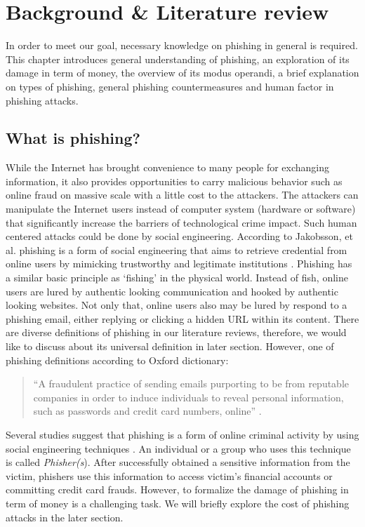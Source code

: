 
\chapter{Background \& Literature review}

In order to meet our goal, necessary knowledge on phishing in general
is required. This chapter introduces general understanding of phishing,
an exploration of its damage in term of money, the overview of its
modus operandi, a brief explanation on types of phishing, general
phishing countermeasures and human factor in phishing attacks.


\section{What is phishing?}

While the Internet has brought convenience to many people for exchanging
information, it also provides opportunities to carry malicious behavior
such as online fraud on massive scale with a little cost to the attackers.
The attackers can manipulate the Internet users instead of computer
system (hardware or software) that significantly increase the barriers
of technological crime impact. Such human centered attacks could be
done by social engineering. According to Jakobsson, et al. phishing
is a form of social engineering that aim{\small{}s} to retrieve credential
from online users by mimicking trustworthy and legitimate institutions
\citep{jakobsson:2006}. Phishing has a similar basic principle as
\textquoteleft fishing\textquoteright{} in the physical world. Instead
of fish, online users are lured by authentic looking communication
and hooked by authentic looking websites. Not only that, online users
also may be lured by respond to a phishing email, either replying
or clicking a hidden URL within its content. There are diverse definitions
of phishing in our literature reviews, therefore, we would like to
discuss about its universal definition in later section. However,
one of phishing definitions according to Oxford dictionary:
\begin{quote}
``A fraudulent practice of sending emails purporting to be from reputable
companies in order to induce individuals to reveal personal information,
such as passwords and credit card numbers, online'' \citep{oxford}. 
\end{quote}
\begin{onehalfspace}
Several studies suggest that phishing is a form of online criminal
activity by using social engineering techniques \citep{jakobsson:2006}\citep{workman:2008}\citep{jagatic2007social}\citep{chandrasekaran:2006}.
An individual or a group who uses this technique is called \emph{Phisher(s}).
After successfully obtained a sensitive information from the victim,
phishers use this information to access victim\textquoteright s financial
accounts or committing credit card frauds. However, to formalize the
damage of phishing in term of money is a challenging task. We will
briefly explore the cost of phishing attacks in the later section. 
\end{onehalfspace}

